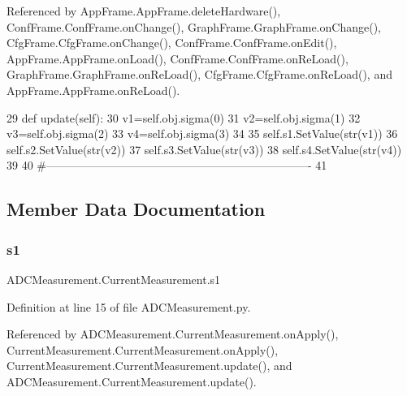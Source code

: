 Referenced by App\+Frame.\+App\+Frame.\+delete\+Hardware(), Conf\+Frame.\+Conf\+Frame.\+on\+Change(), Graph\+Frame.\+Graph\+Frame.\+on\+Change(), Cfg\+Frame.\+Cfg\+Frame.\+on\+Change(), Conf\+Frame.\+Conf\+Frame.\+on\+Edit(), App\+Frame.\+App\+Frame.\+on\+Load(), Conf\+Frame.\+Conf\+Frame.\+on\+Re\+Load(), Graph\+Frame.\+Graph\+Frame.\+on\+Re\+Load(), Cfg\+Frame.\+Cfg\+Frame.\+on\+Re\+Load(), and App\+Frame.\+App\+Frame.\+on\+Re\+Load().


\begin{DoxyCode}
29     \textcolor{keyword}{def }update(self):
30         v1=self.obj.sigma(0)
31         v2=self.obj.sigma(1)
32         v3=self.obj.sigma(2)
33         v4=self.obj.sigma(3)
34 
35         self.s1.SetValue(str(v1))
36         self.s2.SetValue(str(v2))
37         self.s3.SetValue(str(v3))
38         self.s4.SetValue(str(v4))        
39 
40 \textcolor{comment}{#----------------------------------------------------------------------}
41 
\end{DoxyCode}


\subsection{Member Data Documentation}
\mbox{\label{classADCMeasurement_1_1CurrentMeasurement_ab3415b829a716f76fc9503aa932fa0b7}} 
\subsubsection{\texorpdfstring{s1}{s1}}
{\footnotesize\ttfamily A\+D\+C\+Measurement.\+Current\+Measurement.\+s1}



Definition at line 15 of file A\+D\+C\+Measurement.\+py.



Referenced by A\+D\+C\+Measurement.\+Current\+Measurement.\+on\+Apply(), Current\+Measurement.\+Current\+Measurement.\+on\+Apply(), Current\+Measurement.\+Current\+Measurement.\+update(), and A\+D\+C\+Measurement.\+Current\+Measurement.\+update().

\mbox{\label{classADCMeasurement_1_1CurrentMeasurement_a7bf546778b1b2e06ae9b3c07b8bccb95}} 
